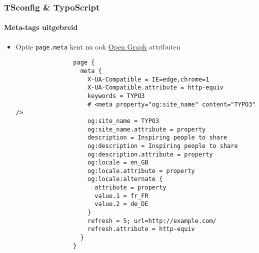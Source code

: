 \begin{frame}[fragile]
	\frametitle{TSconfig \& TypoScript}
	\framesubtitle{Meta-tags uitgebreid}

	\lstset{basicstyle=\tiny\ttfamily}

	\begin{itemize}


		\item Optie \texttt{page.meta} kent nu ook \href{http://ogp.me}{Open Graph} attributen

			\begin{lstlisting}
				page {
				  meta {
				    X-UA-Compatible = IE=edge,chrome=1
				    X-UA-Compatible.attribute = http-equiv
				    keywords = TYPO3
				    # <meta property="og:site_name" content="TYPO3" />
				    og:site_name = TYPO3
				    og:site_name.attribute = property
				    description = Inspiring people to share
				    og:description = Inspiring people to share
				    og:description.attribute = property
				    og:locale = en_GB
				    og:locale.attribute = property
				    og:locale:alternate {
				      attribute = property
				      value.1 = fr_FR
				      value.2 = de_DE
				    }
				    refresh = 5; url=http://example.com/
				    refresh.attribute = http-equiv
				  }
				}
			\end{lstlisting}

	\end{itemize}

\end{frame}


